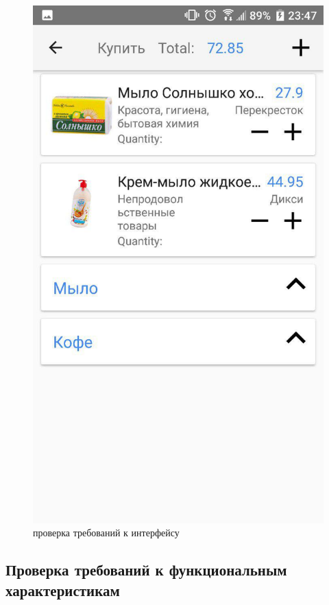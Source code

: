 \begin{figure}[h!]
    \centering
    \includegraphics[height=0.48\textheight]{./screenshots/3/shoplist.jpg}
    \caption{проверка требований к интерфейсу}
\end{figure}

\newpage
\subsection{Проверка требований к функциональным характеристикам}

